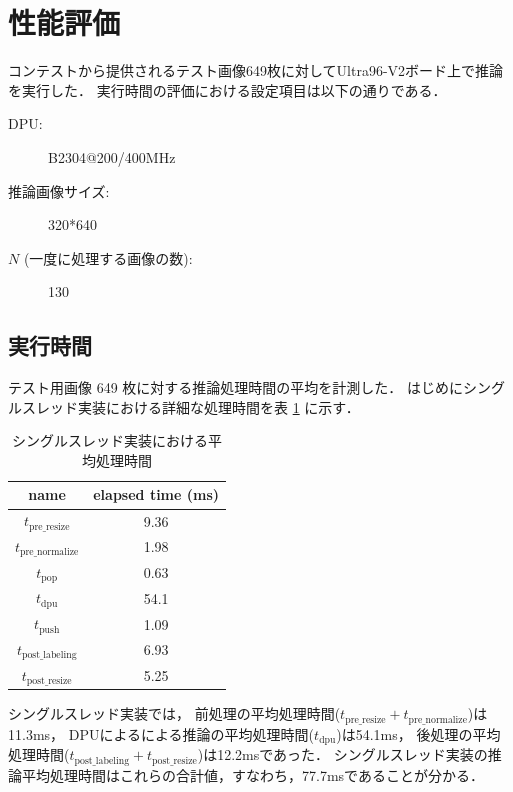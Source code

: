 \section{性能評価}
コンテストから提供されるテスト画像649枚に対してUltra96-V2ボード上で推論を実行した．
実行時間の評価における設定項目は以下の通りである．
\begin{description}
  \item[DPU:] B2304@200/400MHz
  \item[推論画像サイズ:] 320*640
  \item[$N$ (一度に処理する画像の数):] 130
\end{description}
\subsection{実行時間}
テスト用画像 649 枚に対する推論処理時間の平均を計測した．
はじめにシングルスレッド実装における詳細な処理時間を表 \ref{tbl:time-singlethread} に示す．

\begin{table}[h]
  \caption{シングルスレッド実装における平均処理時間} \vspace{1mm}
  \label{tbl:time-singlethread}
  \begin{center}
    \begin{tabular}{cc}
      name & elapsed time (ms) \\ \hline
      $t_{\mathrm{pre\_resize}}$    & 9.36 \\ \hline
      $t_{\mathrm{pre\_normalize}}$ & 1.98 \\ \hline
      $t_{\mathrm{pop}}$            & 0.63 \\ \hline
      $t_{\mathrm{dpu}}$            & 54.1 \\ \hline
      $t_{\mathrm{push}}$           & 1.09 \\ \hline
      $t_{\mathrm{post\_labeling}}$ & 6.93 \\ \hline
      $t_{\mathrm{post\_resize}}$   & 5.25 \\ \hline
    \end{tabular}
  \end{center}
\end{table}

シングルスレッド実装では，
前処理の平均処理時間($t_{\mathrm{pre\_resize}} + t_{\mathrm{pre\_normalize}}$)は11.3ms，
DPUによるによる推論の平均処理時間($t_{\mathrm{dpu}}$)は54.1ms，
後処理の平均処理時間($t_{\mathrm{post\_labeling}} + t_{\mathrm{post\_resize}}$)は12.2msであった．
シングルスレッド実装の推論平均処理時間はこれらの合計値，すなわち，77.7msであることが分かる．

